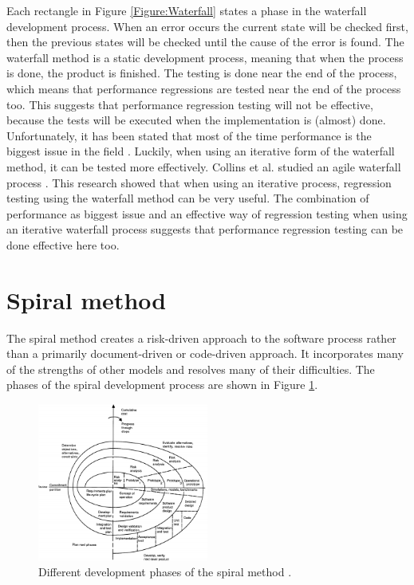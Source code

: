 Each rectangle in Figure \ref{Figure:Waterfall} states a phase in the waterfall development process. When an error occurs the current state will be checked first, then the previous states will be checked until the cause of the error is found. The waterfall method is a static development process, meaning that when the process is done, the product is finished. The testing is done near the end of the process, which means that performance regressions are tested near the end of the process too. This suggests that performance regression testing will not be effective, because the tests will be executed when the implementation is (almost) done. Unfortunately, it has been stated that most of the time performance is the biggest issue in the field \cite{foo2010mining}. Luckily, when using an iterative form of the waterfall method, it can be tested more effectively. Collins et al. studied an agile waterfall process \cite{collins2010iterative}. This research showed that when using an iterative process, regression testing using the waterfall method can be very useful. The combination of performance as biggest issue and an effective way of regression testing when using an iterative waterfall process suggests that performance regression testing can be done effective here too.

\section{Spiral method}
The spiral method creates a risk-driven approach to the software process rather than a primarily document-driven or code-driven approach. It incorporates many of the strengths
of other models and resolves many of their
difficulties\cite{boehm1988spiral}. The phases of the spiral development process are shown in Figure \ref{Figure:Spiral}.

\begin{figure}[H]
\label{Figure:Spiral}
\begin{center}
  \includegraphics[width=0.5\textwidth]{Figures/spiral.jpg}
\end{center}
  \caption{Different development phases of the spiral method \cite{boehm1988spiral}.}
\end{figure}

